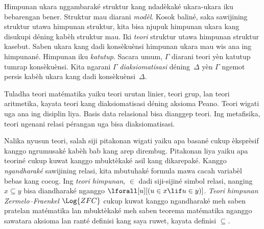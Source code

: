 Himpunan ukara nggambaraké struktur kang ndadèkaké ukara-ukara
iku bebarengan bener. Struktur mau diarani \emph{modèl}.
Kosok baliné, saka sawijining struktur utawa himpunan struktur,
kita bisa njupuk himpunan ukara kang disukupi déning kabèh
struktur mau. Iki \emph{teori} struktur utawa himpunan struktur
kasebut. Saben ukara kang dadi konsèkuènsi himpunan ukara mau
wis ana ing himpunané. Himpunan iku \emph{katutup}. Sacara umum,
$\Gamma$ diarani teori yèn katutup tumrap konsèkuènsi. Kita
ngarani $\Gamma$ \emph{diaksiomatisasi} déning~$\Delta$ yèn
$\Gamma$ ngemot persis kabèh ukara kang dadi konsèkuènsi~$\Delta$.

Tuladha teori matématika yaiku teori urutan linier, teori grup,
lan teori aritmetika, kayata teori kang diaksiomatisasi déning
aksioma Peano. Teori wigati uga ana ing disiplin liya. Basis
data relasional bisa dianggep teori. Ing metafisika, teori
ngenani relasi pérangan uga bisa diaksiomatisasi.

Nalika nyusun teori, salah siji pitakonan wigati yaiku apa basané
cukup èksprèsif kanggo ngrumusaké kabèh bab kang arep dirembug.
Pitakonan liya yaiku apa teoriné cukup kuwat kanggo mbuktèkaké
asil kang dikarepaké. Kanggo \emph{ngandharaké} sawijining relasi,
kita mbutuhaké formula mawa cacah variabèl bebas kang cocog.
Ing \emph{teori himpunan}, $\in$ dadi siji-sijiné simbol relasi,
nanging $x\subseteq y$ bisa diandharaké nganggo
$\lforall[u][(u\in x\lif u\in y)]$. \emph{Teori himpunan
Zermelo--Fraenkel} $\Log{ZFC}$ cukup kuwat kanggo ngandharaké
meh saben pratelan matématika lan mbuktèkaké meh saben teorema
matématika nganggo sawatara aksioma lan ranté definisi kang saya
ruwet, kayata definisi $\subseteq$.
